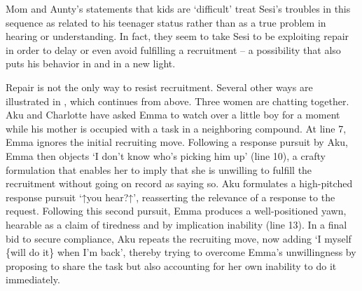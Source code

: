 \documentclass[output=paper]{langsci/langscibook}
\begin{document}
\normalsize
Mom and Aunty’s statements that kids are ‘difficult’ treat Sesi’s troubles in this sequence as related to his teenager status rather than as a true problem in hearing or understanding. In fact, they seem to take Sesi to be exploiting repair in order to delay or even avoid fulfilling a recruitment -- a possibility that also puts his behavior in  and  in a new light.

Repair is not the only way to resist recruitment. Several other ways are illustrated in , which continues from  above. Three women are chatting together. Aku and Charlotte have asked Emma to watch over a little boy for a moment while his mother is occupied with a task in a neighboring compound. At line 7, Emma ignores the initial recruiting move. Following a response pursuit by Aku, Emma then objects ‘I don’t know who’s picking him up’ (line 10), a crafty formulation that enables her to imply that she is unwilling to fulfill the recruitment without going on record as saying so. Aku formulates a high-pitched response pursuit ‘↑you hear?↑’, reasserting the relevance of a response to the request. Following this second pursuit, Emma produces a well-positioned yawn, hearable as a claim of tiredness and by implication inability (line 13). In a final bid to secure compliance, Aku repeats the recruiting move, now adding ‘I myself \{will do it\} when I’m back’, thereby trying to overcome Emma’s unwillingness by proposing to share the task but also accounting for her own inability to do it immediately.
\end{document}
